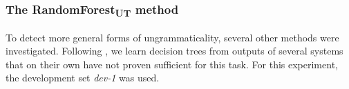 \documentclass[a4paper,10pt]{scrartcl}
\theoremstyle{style}
\begin{document}




\subsubsection{The RandomForest\textsubscript{UT} method}
To detect more general forms of ungrammaticality, several other methods were investigated. Following \cite{wagner2007comparative}, we learn decision trees from outputs of several systems that on their own have not proven sufficient for this task. For this experiment, the development set \textit{dev-1} was used.
\end{document}
